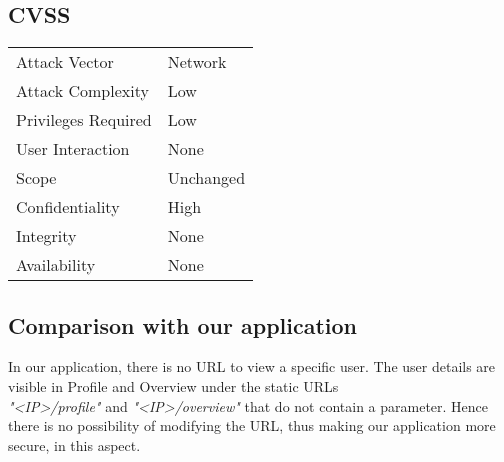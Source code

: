 \subsection{CVSS}
\begin{tabular}{l | l}
Attack Vector		& Network \\
Attack Complexity	& Low \\
Privileges Required & Low \\
User Interaction	& None \\
Scope				& Unchanged \\
Confidentiality		& High \\
Integrity			& None \\
Availability		& None
\end{tabular}

\subsection{Comparison with our application}
In our application, there is no URL to view a specific user. The user details are visible in Profile and Overview under the static URLs \\ 
\textit{"<IP>/profile"} and \textit{"<IP>/overview"} that do not contain a parameter. Hence there is no possibility of modifying the URL, thus making our application more secure, in this aspect.
\clearpage